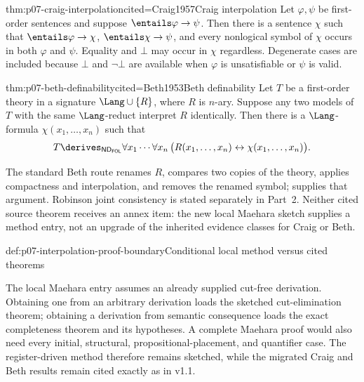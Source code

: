 \begin{hbtheorem}{thm:p07-craig-interpolation}{cited=Craig1957}{Craig interpolation}
Let \(\varphi,\psi\) be first-order sentences and suppose
\(\entails\varphi\to\psi\).  Then there is a sentence \(\chi\) such that
\(\entails\varphi\to\chi\), \(\entails\chi\to\psi\), and every
nonlogical symbol of \(\chi\) occurs in both \(\varphi\) and \(\psi\).
Equality and \(\bot\) may occur in \(\chi\) regardless.  Degenerate cases
are included because \(\bot\) and \(\neg\bot\) are available when
\(\varphi\) is unsatisfiable or \(\psi\) is valid.
\end{hbtheorem}

\begin{hbtheorem}{thm:p07-beth-definability}{cited=Beth1953}{Beth definability}
Let \(T\) be a first-order theory in a signature
\(\Lang\cup\{R\}\), where \(R\) is \(n\)-ary.  Suppose any two models of
\(T\) with the same \(\Lang\)-reduct interpret \(R\) identically.  Then
there is a \(\Lang\)-formula
\(\chi(x_1,\ldots,x_n)\) such that
\[
 T\derives_{\mathsf{ND}_{\mathsf{FOL}}}
 \forall x_1\cdots\forall x_n\,
 \bigl(R(x_1,\ldots,x_n)\leftrightarrow
       \chi(x_1,\ldots,x_n)\bigr).
\]
\end{hbtheorem}

The standard Beth route renames \(R\), compares two copies of the theory,
applies compactness and interpolation, and removes the renamed symbol;
\cite{Hodges1993} supplies that argument.  Robinson joint consistency is
stated separately in Part~2.  Neither cited source theorem receives an annex
item: the new local Maehara sketch supplies a method entry, not an upgrade of
the inherited evidence classes for Craig or Beth.

\begin{proofboundary}{def:p07-interpolation-proof-boundary}{Conditional local method versus cited theorems}
\par\noindent
The local Maehara entry assumes an already supplied cut-free derivation.
Obtaining one from an arbitrary derivation loads the sketched cut-elimination
theorem; obtaining a derivation from semantic consequence loads the exact
completeness theorem and its hypotheses.  A complete Maehara proof would also
need every initial, structural, propositional-placement, and quantifier case.
The register-driven method therefore remains sketched, while the migrated
Craig and Beth results remain cited exactly as in v1.1.
\end{proofboundary}


